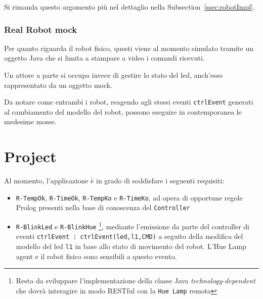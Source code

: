\documentclass{../llncs}
\newcommand{\codescript}[1]{{\mbox{\small{\texttt{#1}}}}\xspace}
\newcommand{\code}[1]{{\color{blue}\small{\texttt{#1}}}}
\newcommand{\labelsec}[1]{\label{sec:#1}}
\newcommand{\xss}[1]{\subsectionname~\ref{ssec:#1}}
\newcommand{\subsectionname}{Subsection}
\begin{document}
Si rimanda questo argomento più nel dettaglio nella \xss{robotImpl}.

\subsubsection{Real Robot mock}
Per quanto riguarda il robot fisico, questi viene al momento simulato tramite un oggetto Java che si limita a stampare a video i comandi ricevuti.

Un attore a parte si occupa invece di gestire lo stato del led, anch'esso rappresentato da un oggetto mock.\\



\vspace{8px}

Da notare come entrambi i robot, reagendo agli stessi eventi \codescript{ctrlEvent} generati al cambiamento del modello del robot, possono eseguire in contemporanea le medesime mosse.

\section{Project}
\labelsec{Project}
Al momento, l'applicazione è in grado di soddisfare i seguenti requisiti:
\begin{itemize}
\item \code{R-TempOk}, \code{R-TimeOk}, \code{R-TempKo} e \code{R-TimeKo}, ad opera di opportune regole Prolog presenti nella base di conoscenza del \texttt{Controller}
\item \code{R-BlinkLed} e \code{R-BlinkHue}
\footnote{Resta da sviluppare l'implementazione della classe Java \emph{technology-dependent} che dovrà interagire in modo RESTful con la \texttt{Hue Lamp} remota}, mediante l'emissione da parte del controller di eventi \codescript{ctrlEvent : ctrlEvent(led,l1,CMD)} a seguito della modifica del modello del led \codescript{l1} in base allo stato di movimento del robot. L'Hue Lamp agent e il robot fisico sono sensibili a questo evento.
\end{itemize}
\end{document}
